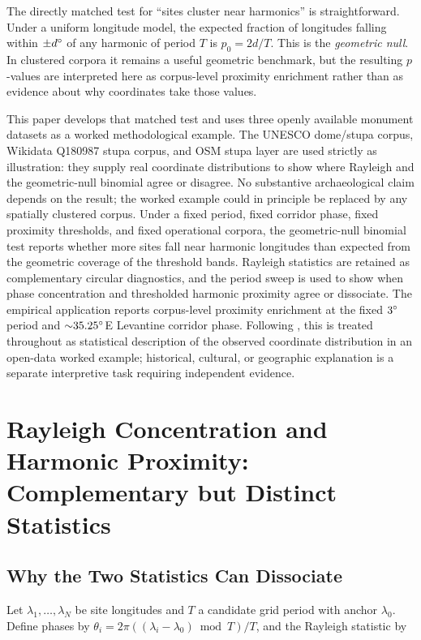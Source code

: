 \documentclass[12pt,a4paper]{article}
\newcommand{\degr}{\ifmmode^\circ\else\textdegree{}\fi}
\begin{document}
The directly matched test for ``sites cluster near harmonics'' is
straightforward. Under a uniform longitude model, the expected fraction
of longitudes falling within $\pm d\degr$ of any harmonic of period $T$
is $p_0 = 2d/T$. This is the \emph{geometric null}. In clustered
corpora it remains a useful geometric benchmark, but the resulting
$p$-values are interpreted here as corpus-level proximity enrichment
rather than as evidence about why coordinates take those values.

This paper develops that matched test and uses three openly available monument
datasets as a worked methodological example. The UNESCO dome/stupa corpus,
Wikidata Q180987 stupa corpus, and OSM stupa layer are used strictly as
illustration: they supply real coordinate distributions to show where Rayleigh
and the geometric-null binomial agree or disagree. No substantive
archaeological claim depends on the result; the worked example could in principle
be replaced by any spatially clustered corpus. Under a fixed period, fixed corridor phase,
fixed proximity thresholds, and fixed operational corpora, the
geometric-null binomial test reports whether more sites fall near
harmonic longitudes than expected from the geometric coverage of the
threshold bands. Rayleigh statistics are retained as complementary
circular diagnostics, and the period sweep is used to show when phase
concentration and thresholded harmonic proximity agree or dissociate.
The empirical application reports corpus-level proximity enrichment
at the fixed $3\degr$ period and ${\sim}35.25\degr$E Levantine corridor
phase. Following \citet{silva2020statistical}, this is treated
throughout as statistical description of the observed coordinate distribution in an
open-data worked example; historical, cultural, or geographic
explanation is a separate interpretive task requiring independent
evidence.

\section{Rayleigh Concentration and Harmonic Proximity:\\
Complementary but Distinct Statistics}
\label{sec:rayleigh_vs_binom}

\subsection{Why the Two Statistics Can Dissociate}

Let $\lambda_1, \ldots, \lambda_N$ be site longitudes and $T$ a
candidate grid period with anchor $\lambda_0$. Define phases by
$\theta_i = 2\pi((\lambda_i - \lambda_0) \bmod T)/T$, and the
Rayleigh statistic by
\end{document}
